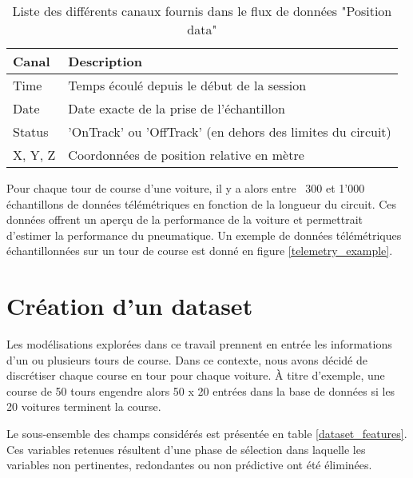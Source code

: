 \begin{table}[H]
    \begin{center}
        \caption{Liste des différents canaux fournis dans le flux de données "Position data" \cite{fastf1documentation}}
        \begin{tabular}{l|l}
            Canal   & Description                                                \\ \hline
            Time    & Temps écoulé depuis le début de la session                 \\
            Date    & Date exacte de la prise de l'échantillon                   \\
            Status  & 'OnTrack' ou 'OffTrack' (en dehors des limites du circuit) \\
            X, Y, Z & Coordonnées de position relative en mètre
        \end{tabular}
    \end{center}
\end{table}

Pour chaque tour de course d'une voiture, il y a alors entre ~300 et 1'000 échantillons de données télémétriques en fonction de la longueur du circuit.
Ces données offrent un aperçu de la performance de la voiture et permettrait d'estimer la performance du pneumatique.
Un exemple de données télémétriques échantillonnées sur un tour de course est donné en figure \ref{telemetry_example}.

\section{Création d'un dataset}

Les modélisations explorées dans ce travail prennent en entrée les informations d'un ou plusieurs tours de course.
Dans ce contexte, nous avons décidé de discrétiser chaque course en tour pour chaque voiture.
À titre d'exemple, une course de 50 tours engendre alors 50 x 20 entrées dans la base de données si les 20 voitures terminent la course.

Le sous-ensemble des champs considérés est présentée en table \ref{dataset_features}. Ces variables retenues résultent d'une phase de sélection dans laquelle
les variables non pertinentes, redondantes ou non prédictive ont été éliminées.

